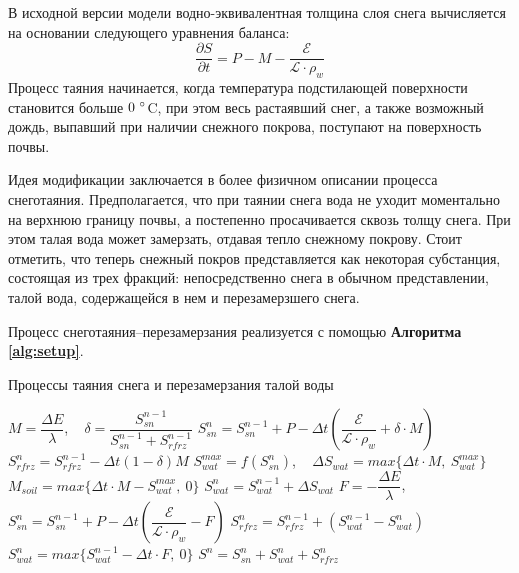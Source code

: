 \documentclass[a4paper, fontsize=12pt]{scrartcl}
\begin{document}
В исходной версии модели водно-эквивалентная толщина слоя снега вычисляется на основании следующего уравнения баланса:
\begin{equation}
    \dfrac{\partial S}{\partial t} = P - M - \dfrac{\mathcal{E}}{\mathcal{L} \cdot \rho_w}  \label{sys}
\end{equation}
Процесс таяния начинается, когда температура подстилающей поверхности становится больше $0 ~\degree$C, при этом весь растаявший снег, а также возможный дождь, выпавший при наличии снежного покрова, поступают на поверхность почвы.

Идея модификации заключается в более физичном описании процесса снеготаяния. Предполагается, что при таянии снега вода не уходит моментально на верхнюю границу почвы, а постепенно просачивается сквозь толщу снега. При этом талая вода может замерзать, отдавая тепло снежному покрову. Стоит отметить, что теперь снежный покров представляется как некоторая субстанция, состоящая из трех фракций: непосредственно снега в обычном представлении, талой вода, содержащейся в нем и перезамерзшего снега. 

Процесс снеготаяния--перезамерзания реализуется с помощью \textbf{Алгоритма \ref{alg:setup}}. 

\begin{algorithm}[H]
\caption{Процессы таяния снега и перезамерзания талой воды}
\label{alg:setup}
\begin{algorithmic}[]
        \State $ M = \dfrac{\Delta E}{\lambda} $, ~ $ \delta = \dfrac{S_{sn}^{n-1}}{S_{sn}^{n-1} + S_{rfrz}^{n - 1}}$ 
        \State $ S_{sn}^n = S_{sn}^{n-1} + P - \Delta t \left( \dfrac{\mathcal{E}}{\mathcal{L} \cdot \rho_w} + \delta \cdot M \right) $ 
        \State $ S_{rfrz}^n = S_{rfrz}^{n - 1} - \Delta t (1 - \delta)M $ 
        \State $ S_{wat}^{max} = f( S_{sn}^n ) $, ~ $ \Delta S_{wat} = max\{\Delta t \cdot M, ~S_{wat}^{max}\} $ 
        \State $ M_{soil} = max\{\Delta t \cdot M - S_{wat}^{max}, ~0\} $ 
        \State $ S_{wat}^n = S_{wat}^{n-1} + \Delta S_{wat} $ 
    \Else
            \State $F = -\dfrac{\Delta E}{\lambda}$, ~ $S_{sn}^n = S_{sn}^{n-1} + P - \Delta t \left( \dfrac{\mathcal{E}}{\mathcal{L} \cdot \rho_w} - F \right)$
            \State $S_{rfrz}^n = S_{rfrz}^{n - 1} + ( S_{wat}^{n-1} - S_{wat}^n )$
            \State $S_{wat}^n = max\{ S_{wat}^{n-1} - \Delta t \cdot F, ~0\}$
        \EndIf
    \EndIf
    \State $S^n = S_{sn}^n + S_{wat}^n + S_{rfrz}^n$
\end{algorithmic}
\end{algorithm}
\end{document}
